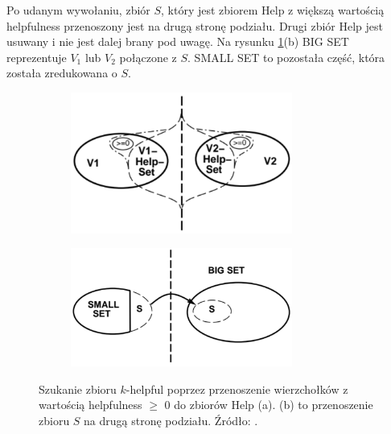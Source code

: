 Po udanym wywołaniu, zbiór $S$, który jest zbiorem Help z większą wartością helpfulness przenoszony jest
na drugą stronę podziału.
Drugi zbiór Help jest usuwany i nie jest dalej brany pod uwagę.
Na rysunku \ref{im:building-helpfulsets}(b) BIG SET reprezentuje $V_1$ lub $V_2$ połączone z $S$.
SMALL SET to pozostała część, która została zredukowana o $S$.
\begin{figure}[h]
\begin{subfigure}{.5\textwidth}
    \centering
    \includegraphics[width=0.8\textwidth]{images/building-helpfulsets/1}
    \caption[short]{}
\end{subfigure}
\begin{subfigure}{.5\textwidth}
    \centering
    \includegraphics[width=0.8\textwidth]{images/building-helpfulsets/2}
    \caption[short]{}
\end{subfigure}%
\caption{Szukanie zbioru $k$-helpful poprzez przenoszenie wierzchołków z wartością helpfulness $\geq$ $0$
do zbiorów Help (a). (b) to przenoszenie zbioru $S$ na drugą stronę podziału.
Źródło: \cite{article}.}
\label{im:building-helpfulsets}
\end{figure}